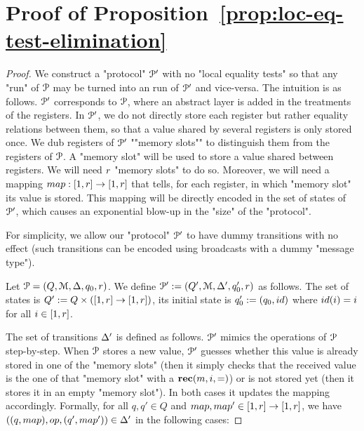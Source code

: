 \section{Proof of Proposition~\ref{prop:loc-eq-test-elimination}}
\label{sec:proof-lol-eq-test-elim}

\SimpleReduction*

\begin{proof}
	We construct a "protocol" $\mathcal{P}'$ with no "local equality tests" so that any "run" of $\mathcal{P}$ may be turned into an run of $\mathcal{P}'$ and vice-versa. 
	The intuition is as follows. $\mathcal{P}'$ corresponds to $\mathcal{P}$, where an abstract layer is added in the treatments of the registers. In $\mathcal{P}'$, we do not directly store each register but rather equality relations between them, so that a value shared by several registers is only stored once. We dub registers of $\mathcal{P}'$ ""memory slots"" to distinguish them from the registers of $\mathcal{P}$. A "memory slot" will be used to store a value shared between registers. 
	We will need $r$ "memory slots" to do so. Moreover, we will need a mapping $\map : \nset{1}{r} \to \nset{1}{r}$ that tells, for each register, in which "memory slot" its value is stored. This mapping will be directly encoded in the set of states of $\mathcal{P}'$, which causes an exponential blow-up in the "size" of the "protocol".
	
	For simplicity, we allow our "protocol" $\mathcal{P}'$ to have dummy transitions with no effect (such transitions can be encoded using broadcasts with a dummy "message type"). 
	
	Let $\mathcal{P} = (Q, \mathcal{M}, \Delta, q_0, r)$. 
	We define $\mathcal{P}' := (Q', \mathcal{M}, \Delta', q_0', r)$ as follows. The set of states is $Q' := Q \times ([1,r] \to [1,r])$, its initial state is $q_0' := (q_0, \idmap)$ where $\idmap(i) = i$ for all $i \in [1,r]$. 
	
	The set of transitions $\Delta'$ is defined as follows.
	$\mathcal{P}'$ mimics the operations of $\mathcal{P}$ step-by-step. When $\mathcal{P}$ stores a new value, $\mathcal{P}'$ guesses whether this value is already stored in one of the "memory slots" (then it simply checks that the received value is the one of that "memory slot" with a $\textbf{rec}(m, i, {=})$) or is not stored yet (then it stores it in an empty "memory slot"). In both cases it updates the mapping accordingly.
	Formally, for all $q,q' \in Q$ and $\map, \map' \in \nset{1}{r} \to \nset{1}{r}$, we have $((q, \map), \op, (q', \map')) \in \transitions'$ in the following cases:
	

\end{proof}
